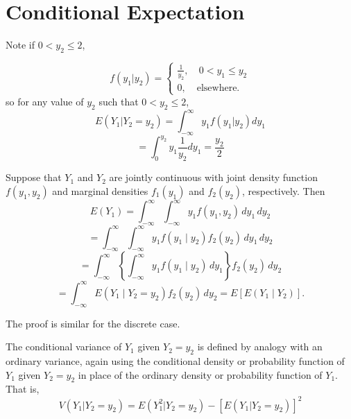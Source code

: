 \documentclass{report}
\begin{document}
\section{Conditional Expectation}
\sol Note if $0 < y_2 \leq 2$,

\[
f(y_1|y_2) = 
\begin{cases}
	\frac{1}{y_2}, & \ 0 < y_1 \leq y_2  \\
	0, & \text{elsewhere}.
\end{cases}
\]
so for any value of $y_2$ such that $0<y_2 \leq 2$,
$$E(Y_1 | Y_2 = y_2) = \int_{-\infty}^{\infty}y_1 f(y_1 | y_2)dy_1$$
$$= \int_{0}^{y_2}y_1 \frac{1}{y_2}dy_1 = \frac{y_2}{2}$$

\begin{myproof}

Suppose that 
\( Y_1 \) and \( Y_2 \) are jointly continuous with joint density function \( f(y_1, y_2) \) and marginal densities \( f_1(y_1) \) and \( f_2(y_2) \), respectively. Then
\[
E(Y_1) = \int_{-\infty}^\infty \int_{-\infty}^\infty y_1 f(y_1, y_2) \, dy_1 \, dy_2
\]
\[
= \int_{-\infty}^\infty \int_{-\infty}^\infty y_1 f(y_1 \mid y_2) f_2(y_2) \, dy_1 \, dy_2
\]
\[
= \int_{-\infty}^\infty \left\{ \int_{-\infty}^\infty y_1 f(y_1 \mid y_2) \, dy_1 \right\} f_2(y_2) \, dy_2
\]
\[
= \int_{-\infty}^\infty E(Y_1 \mid Y_2 = y_2) f_2(y_2) \, dy_2 = E[E(Y_1 \mid Y_2)].
\]

The proof is similar for the discrete case.

\end{myproof}
The conditional variance of $Y_1$ given $Y_2 = y_2$ is defined by analogy with an
ordinary variance, again using the conditional density or probability function of
$Y_1$ given $Y_2 = y_2$ in place of the ordinary density or probability function of $Y_1$.
That is,
$$V(Y_1|Y_2 = y_2) = E(Y_1^{2}|Y_2 = y_2) - [E(Y_1|Y_2 = y_2)]^2$$
\end{document}
